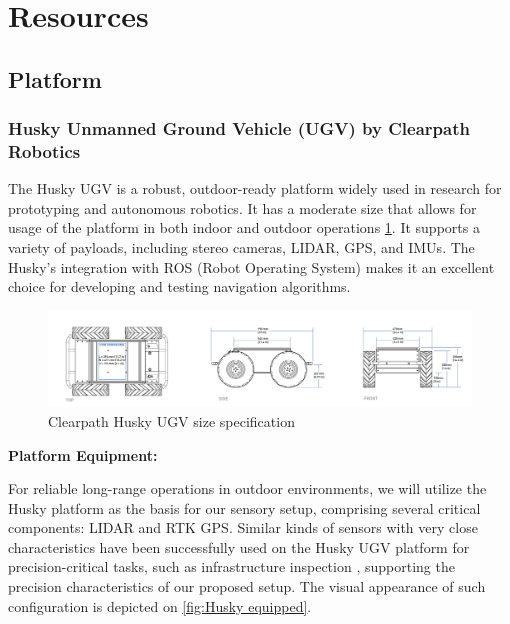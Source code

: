 \documentclass[runningheads]{llncs}
\newcommand{\comment}[2][Comment]{\todo[inline,color=blue!20!white]{\textbf{#1}: #2}}
\begin{document}
\comment{Fine to read}

\section{Resources}


\subsection{Platform}
\subsubsection{Husky Unmanned Ground Vehicle (UGV) by Clearpath Robotics}

The Husky UGV \cite{clearpath_husky_ugv} is a robust, outdoor-ready platform widely used in research for prototyping and autonomous robotics. It has a moderate size that allows for usage of the platform in both indoor and outdoor operations \ref{fig:Clearpath Husky size specs}. It supports a variety of payloads, including stereo cameras, LIDAR, GPS, and IMUs. The Husky’s integration with ROS (Robot Operating System) makes it an excellent choice for developing and testing navigation algorithms.

\begin{figure}
    \centering
    \includegraphics[width=1\linewidth]{img/HuskyScheme.png}
    \caption{Clearpath Husky UGV size specification}
    \label{fig:Clearpath Husky size specs}
\end{figure}

\textbf{Platform Equipment:}

For reliable long-range operations in outdoor environments, we will utilize the Husky platform as the basis for our sensory setup, comprising several critical components: LIDAR and RTK GPS. Similar kinds of sensors with very close characteristics have been successfully used on the Husky UGV platform for precision-critical tasks, such as infrastructure inspection \cite{AutomatedBridgeInspection_UGV_2019}, supporting the precision characteristics of our proposed setup. The visual appearance of such configuration is depicted on \ref{fig:Husky equipped}.
\end{document}
